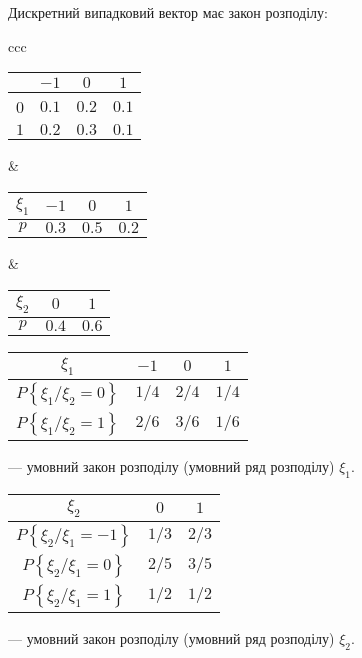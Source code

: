 \begin{example}
    Дискретний випадковий вектор має закон розподілу:

    \begin{tabular}{ccc}
        \begin{tabular}{|c|c|c|c|}
            \hline
            \diagbox{$\xi_2$}{$\xi_1$} & $-1$ & $0$ & $1$\\
            \hline
            0 & $0.1$ & $0.2$ & $0.1$ \\
            \hline
            $1$ & $0.2$ & $0.3$ & $0.1$ \\
            \hline
        \end{tabular}
        &
        \begin{tabular}{|c|c|c|c|}
            \hline
            $\xi_1$ & $-1$ & $0$ & $1$ \\
            \hline
            $p$ & $0.3$ & $0.5$ & $0.2$ \\
            \hline
        \end{tabular}
        &
        \begin{tabular}{|c|c|c|}
            \hline
            $\xi_2$ & $0$ & $1$ \\
            \hline
            $p$ & $0.4$ & $0.6$ \\
            \hline
        \end{tabular}
    \end{tabular}
\end{example}

\begin{tabular}{|c|c|c|c|}
    \hline
    $\xi_1$ & $-1$ & $0$ & $1$ \\
    \hline
    $P\left\{\xi_1 / \xi_2 = 0\right\}$ & $1/4$ 
    & $2/4$ & $1/4$ \\
    \hline
    $P\left\{\xi_1 / \xi_2 = 1\right\}$ & $2/6$ 
    & $3/6$ & $1/6$ \\
    \hline
\end{tabular}
--- умовний закон розподілу (умовний ряд розподілу) $\xi_1$.

\begin{tabular}{|c|c|c|}
    \hline
    $\xi_2$ & $0$ & $1$ \\
    \hline
    $P\left\{\xi_2 / \xi_1 = -1\right\}$ & $1/3$ 
    & $2/3$ \\
    \hline
    $P\left\{\xi_2 / \xi_1 = 0\right\}$ & $2/5$ 
    & $3/5$\\
    \hline
    $P\left\{\xi_2 / \xi_1 = 1\right\}$ & $1/2$ 
    & $1/2$\\
    \hline
\end{tabular}
--- умовний закон розподілу (умовний ряд розподілу) $\xi_2$.

